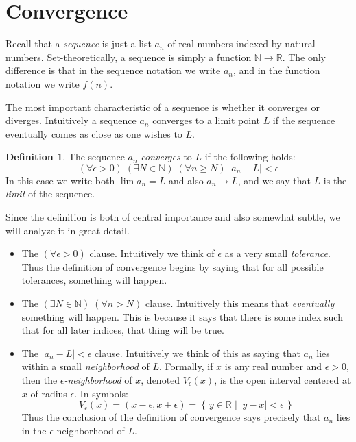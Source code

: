 \documentclass[11pt,oneside]{amsbook}
\newcommand{\set}[1]{\left\{\,#1\,\right\}}
\newcommand{\NN}{\mathbb N}
\newcommand{\RR}{\mathbb R}
\theoremstyle{definition}
\theoremstyle{plain}
\theoremstyle{definition}
\newtheorem{defn}[thm]{Definition}
\theoremstyle{remark}
\numberwithin{equation}{section}
\numberwithin{figure}{section}
\begin{document}
\section{Convergence}

Recall that a \emph{sequence} is just a list $a_n$ of real numbers indexed by natural numbers. Set-theoretically, a sequence is simply a function $\NN\to\RR$. The only difference is that in the sequence notation we write $a_n$, and in the function notation we write $f(n)$.

The most important characteristic of a sequence is whether it converges or diverges. Intuitively a sequence $a_n$ converges to a limit point $L$ if the sequence eventually comes as close as one wishes to $L$.

\begin{defn}
  The sequence $a_n$ \emph{converges} to $L$ if the following holds:
  \[(\forall\epsilon>0)\;(\exists N\in\NN)\;(\forall n\geq N)\;|a_n-L|<\epsilon
  \]
  In this case we write both $\lim a_n=L$ and also $a_n\to L$, and we say that $L$ is the \emph{limit} of the sequence.
\end{defn}

Since the definition is both of central importance and also somewhat subtle, we will analyze it in great detail.

\begin{itemize}
\item The $(\forall\epsilon>0)$ clause. Intuitively we think of $\epsilon$ as a very small \emph{tolerance}. Thus the definition of convergence begins by saying that for all possible tolerances, something will happen.
\item The $(\exists N\in\NN)\;(\forall n>N)$ clause. Intuitively this means that \emph{eventually} something will happen. This is because it says that there is some index such that for all later indices, that thing will be true.
\item The $|a_n-L|<\epsilon$ clause. Intuitively we think of this as saying that $a_n$ lies within a small \emph{neighborhood} of $L$. Formally, if $x$ is any real number and $\epsilon>0$, then the \emph{$\epsilon$-neighborhood} of $x$, denoted $V_\epsilon(x)$, is the open interval centered at $x$ of radius $\epsilon$. In symbols:
  \[V_\epsilon(x)=(x-\epsilon,x+\epsilon)=\set{y\in\RR\mid|y-x|<\epsilon}
  \]
  Thus the conclusion of the definition of convergence says precisely that $a_n$ lies in the $\epsilon$-neighborhood of $L$.
\end{itemize}
\end{document}
